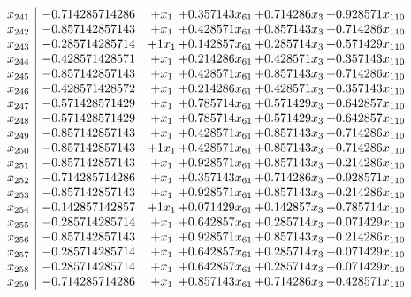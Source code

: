 \documentclass[11pt]{article}
\begin{document}
\[\begin{array}{c| c c@{\hskip 2pt} c@{\hskip 2pt} c@{\hskip 2pt} c@{\hskip 2pt} }
 x_{241}   &  -0.714285714286 & +  x_{1} & + 0.357143 x_{61} & + 0.714286 x_{3} & + 0.928571 x_{110}\\
 x_{242}   &  -0.857142857143 & +  x_{1} & + 0.428571 x_{61} & + 0.857143 x_{3} & + 0.714286 x_{110}\\
 x_{243}   &  -0.285714285714 & + 1 x_{1} & + 0.142857 x_{61} & + 0.285714 x_{3} & + 0.571429 x_{110}\\
 x_{244}   &  -0.428571428571 & +  x_{1} & + 0.214286 x_{61} & + 0.428571 x_{3} & + 0.357143 x_{110}\\
 x_{245}   &  -0.857142857143 & +  x_{1} & + 0.428571 x_{61} & + 0.857143 x_{3} & + 0.714286 x_{110}\\
 x_{246}   &  -0.428571428572 & +  x_{1} & + 0.214286 x_{61} & + 0.428571 x_{3} & + 0.357143 x_{110}\\
 x_{247}   &  -0.571428571429 & +  x_{1} & + 0.785714 x_{61} & + 0.571429 x_{3} & + 0.642857 x_{110}\\
 x_{248}   &  -0.571428571429 & +  x_{1} & + 0.785714 x_{61} & + 0.571429 x_{3} & + 0.642857 x_{110}\\
 x_{249}   &  -0.857142857143 & +  x_{1} & + 0.428571 x_{61} & + 0.857143 x_{3} & + 0.714286 x_{110}\\
 x_{250}   &  -0.857142857143 & + 1 x_{1} & + 0.428571 x_{61} & + 0.857143 x_{3} & + 0.714286 x_{110}\\
 x_{251}   &  -0.857142857143 & +  x_{1} & + 0.928571 x_{61} & + 0.857143 x_{3} & + 0.214286 x_{110}\\
 x_{252}   &  -0.714285714286 & +  x_{1} & + 0.357143 x_{61} & + 0.714286 x_{3} & + 0.928571 x_{110}\\
 x_{253}   &  -0.857142857143 & +  x_{1} & + 0.928571 x_{61} & + 0.857143 x_{3} & + 0.214286 x_{110}\\
 x_{254}   &  -0.142857142857 & + 1 x_{1} & + 0.071429 x_{61} & + 0.142857 x_{3} & + 0.785714 x_{110}\\
 x_{255}   &  -0.285714285714 & +  x_{1} & + 0.642857 x_{61} & + 0.285714 x_{3} & + 0.071429 x_{110}\\
 x_{256}   &  -0.857142857143 & +  x_{1} & + 0.928571 x_{61} & + 0.857143 x_{3} & + 0.214286 x_{110}\\
 x_{257}   &  -0.285714285714 & +  x_{1} & + 0.642857 x_{61} & + 0.285714 x_{3} & + 0.071429 x_{110}\\
 x_{258}   &  -0.285714285714 & +  x_{1} & + 0.642857 x_{61} & + 0.285714 x_{3} & + 0.071429 x_{110}\\
 x_{259}   &  -0.714285714286 & +  x_{1} & + 0.857143 x_{61} & + 0.714286 x_{3} & + 0.428571 x_{110}\\

\end{array}\]
\end{document}
